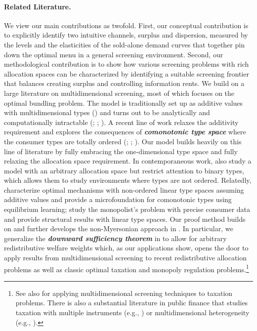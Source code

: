 \documentclass[12pt,letterpaper]{article}
\newenvironment{original}{\color{black}\noindent}{}
\theoremstyle{plain}
\theoremstyle{definition}
\theoremstyle{remark}
\renewcommand{\1}{\mathds{1}}
\theoremstyle{definition}
\begin{document}
\paragraph{Related Literature.}\hspace{-2mm}\begin{original}We view our main contributions as twofold. First, our conceptual contribution is to explicitly identify two intuitive channels, surplus and dispersion, measured by the levels and the elasticities of the sold-alone demand curves that together pin down the optimal menu in a general screening environment. Second, our methodological contribution is to show how various screening problems with rich allocation spaces can be characterized by identifying a suitable screening frontier that balances creating surplus and controlling information rents. We build on a large literature on multidimensional screening, most of which focuses on the optimal bundling problem. The model is traditionally set up as additive values with multidimensional types (\citealt*{McAfee1989MultiproductValues,Rochet1998, mcafee1988multidimensional, manelli2006bundling, daskalakis2017strong}) and turns out to be analytically and computationally intractable (\citealt{Rochet2003}; \citealt{daskalakis2014complexity}; \citealt{lahr2024extreme}). A recent line of work relaxes the additivity requirement and explores the consequences of \textit{\textbf{comonotonic type space}} where the consumer types are totally ordered (\citealt{haghpanah2021pure}; \citealt{ghili2021characterization}; \citealt{yang2023nested}). Our model builds heavily on this line of literature by fully embracing the one-dimensional type space and fully relaxing the allocation space requirement. In contemporaneous work, \citet{haghpanah2025screening} also study a model with an arbitrary allocation space but restrict attention to binary types, which allows them to study environments where types are not ordered.  Relatedly, \cite{pernoud2025bundling} characterize optimal mechanisms with non-ordered linear type spaces assuming additive values and provide a microfoundation for comonotonic types using equilibrium learning; \cite*{frick2024multidimensional} study the monopolist's problem with precise consumer data and provide structural results with linear type spaces.  Our proof method builds on and further develops the non-Myersonian approach in \citet{yang2022costly}. In particular, we generalize the \textit{\textbf{downward sufficiency theorem}} in \citet{yang2022costly} to allow for arbitrary redistributive welfare weights which, as our applications show, opens the door to apply results from multidimensional screening to recent redistributive allocation problems as well as classic optimal taxation and monopoly regulation problems.\footnote{See also \citet{doligalski2025optimal} for applying multidimensional screening techniques to taxation problems. There is also a substantial literature in public finance that studies taxation with multiple instruments (e.g., \citealt*{ferey2024sufficient}) or multidimensional heterogeneity (e.g., \citealt*{golosov2025optimal}).}
\end{original}
\end{document}
